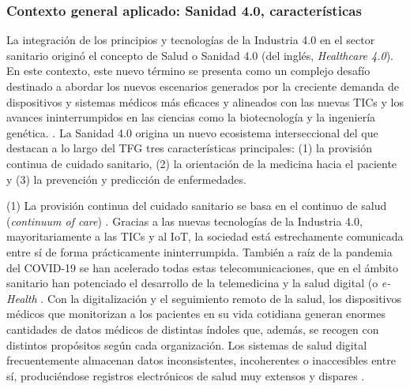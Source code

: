 
\subsubsection{Contexto general aplicado: Sanidad 4.0, características}

La integración de los principios y tecnologías de la Industria 4.0 en el sector sanitario originó el concepto de Salud o Sanidad 4.0 (del inglés, \textit{Healthcare 4.0})\cite{tortorella2020healthcare}\cite{tortorella2021impacts}.  %
En este contexto, este nuevo término se presenta como un complejo desafío  destinado a abordar los nuevos escenarios generados por la creciente demanda de dispositivos y sistemas médicos más eficaces y alineados con las nuevas TICs y los avances ininterrumpidos en las ciencias como la biotecnología y la ingeniería genética. \cite{martin2021ehealth}. La Sanidad 4.0 origina un nuevo ecosistema interseccional del que destacan a lo largo del TFG  tres  características principales: (1) la provisión continua de cuidado sanitario, (2) la orientación de la medicina hacia el paciente y (3) la prevención y predicción de enfermedades.


(1) La provisión continua del cuidado sanitario se basa en el continuo de salud (\textit{continuum of care}) \cite{kouroubali2019new}. Gracias a las nuevas tecnologías de la Industria 4.0, mayoritariamente a las TICs y al IoT, la sociedad está estrechamente comunicada entre sí de forma prácticamente ininterrumpida. También a raíz de la pandemia del COVID-19 se han acelerado todas estas telecomunicaciones, que en el ámbito sanitario han potenciado el desarrollo de la telemedicina y la salud digital (o \textit{e-Health} \cite{martin2021ehealth}. Con la digitalización y el seguimiento remoto de la salud, los dispositivos médicos que monitorizan a los pacientes en su vida cotidiana generan enormes cantidades de datos médicos de distintas índoles que, además, se recogen con distintos propósitos según cada organización. Los sistemas de salud digital frecuentemente almacenan datos inconsistentes, incoherentes o inaccesibles entre sí, produciéndose registros electrónicos de salud muy extensos y dispares \cite{kouroubali2019new}. 



